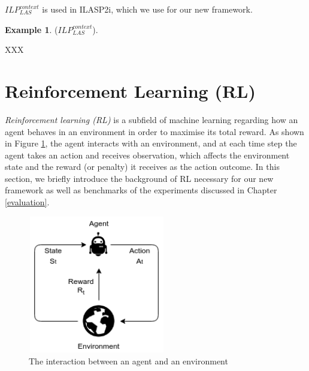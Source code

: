 \documentclass[11pt,twoside]{report}
\theoremstyle{plain}
\theoremstyle{definition}
\newtheorem{examp}{Example}[section]
\begin{document}
$ILP_{LAS}^{context}$ is used in ILASP2i, which we use for our new framework.


\begin{examp} \normalfont ($ILP_{LAS}^{context}$).

XXX
\end{examp}

\section{Reinforcement Learning (RL)}
\label{rl}
\textit{Reinforcement learning (RL)} is a subfield of machine learning regarding how an agent behaves in an environment in order to maximise its total reward. 
As shown in Figure \ref{agent_env}, the agent interacts with an environment, and at each time step the agent takes an action and receives observation, which affects the environment state and the reward (or penalty) it receives as the action outcome. 
In this section, we briefly introduce the background of RL necessary for our new framework as well as benchmarks of the experiments discussed in Chapter \ref{evaluation}.

\begin{figure}[!htb]
\centering
\includegraphics[width=6cm, height=6cm]{./figures/agent_env}
\caption{The interaction between an agent and an environment}
\label{agent_env}
\end{figure}
\end{document}
